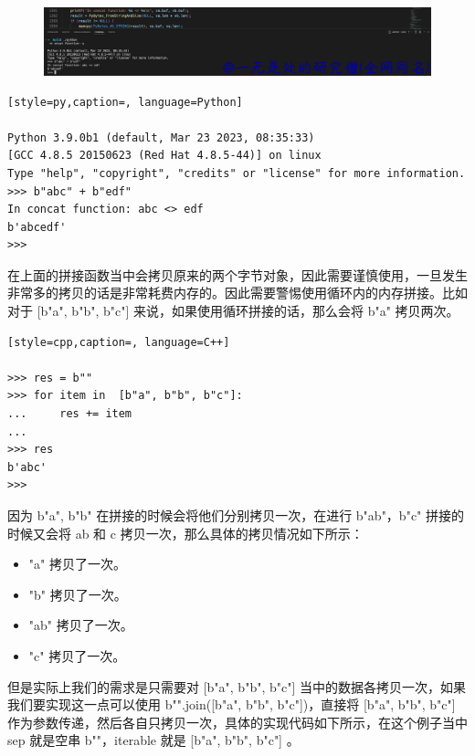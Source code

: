     \begin{figure}[h]
        \centering
            \includegraphics[scale=.2]{images/30-bytes.png}
						\caption{ }
        \label{fig:my_label}
    \end{figure}
    
\begin{lstlisting}[style=py,caption=, language=Python]

Python 3.9.0b1 (default, Mar 23 2023, 08:35:33) 
[GCC 4.8.5 20150623 (Red Hat 4.8.5-44)] on linux
Type "help", "copyright", "credits" or "license" for more information.
>>> b"abc" + b"edf"
In concat function: abc <> edf
b'abcedf'
>>> 
\end{lstlisting}
在上面的拼接函数当中会拷贝原来的两个字节对象，因此需要谨慎使用，一旦发生非常多的拷贝的话是非常耗费内存的。因此需要警惕使用循环内的内存拼接。比如对于 [b"a", b"b", b"c"] 来说，如果使用循环拼接的话，那么会将 b"a" 拷贝两次。
\begin{lstlisting}[style=cpp,caption=, language=C++]

>>> res = b""
>>> for item in  [b"a", b"b", b"c"]:
...     res += item
...
>>> res
b'abc'
>>>
\end{lstlisting}
因为 b"a", b"b" 在拼接的时候会将他们分别拷贝一次，在进行 b"ab"，b"c" 拼接的时候又会将 ab 和 c 拷贝一次，那么具体的拷贝情况如下所示：
\begin{itemize}
\item "a" 拷贝了一次。 
\item "b" 拷贝了一次。 
\item "ab" 拷贝了一次。 
\item "c" 拷贝了一次。 
\end{itemize}
但是实际上我们的需求是只需要对 [b"a", b"b", b"c"] 当中的数据各拷贝一次，如果我们要实现这一点可以使用 b"".join([b"a", b"b", b"c"])，直接将 [b"a", b"b", b"c"] 作为参数传递，然后各自只拷贝一次，具体的实现代码如下所示，在这个例子当中 sep 就是空串 b""，iterable 就是 [b"a", b"b", b"c"] 。
